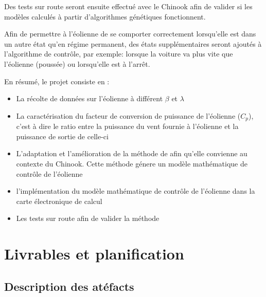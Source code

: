 \documentclass[11pt]{article}
\begin{document}
Des tests sur route seront ensuite effectué avec le Chinook afin de valider si les modèles calculés à partir d'algorithmes génétiques fonctionnent.

Afin de permettre à l'éolienne de se comporter correctement lorsqu'elle est dans un autre état qu'en régime permanent, des états supplémentaires seront ajoutés à l'algorithme de contrôle, par exemple: lorsque la voiture va plus vite que l'éolienne (poussée) ou lorsqu'elle est à l'arrêt.


En résumé, le projet consiste en :
\begin{itemize}
  \item La récolte de données sur l'éolienne à différent $\beta$ et $\lambda$
  \item La caractérisation du facteur de conversion de puissance de l'éolienne ($C_p$), c'est à dire le ratio entre la puissance du vent fournie à l'éolienne et la puissance de sortie de celle-ci
  \item L'adaptation et l'amélioration de la méthode de \cite{Ouissam12} afin qu'elle convienne au contexte du Chinook. Cette méthode génere un modèle mathématique de contrôle de l'éolienne
  \item l'implémentation du modèle mathématique de contrôle de l'éolienne dans la carte électronique de calcul
  \item Les tests sur route afin de valider la méthode
\end{itemize}

\section{Livrables et planification}
\subsection{Description des atéfacts}
\end{document}
